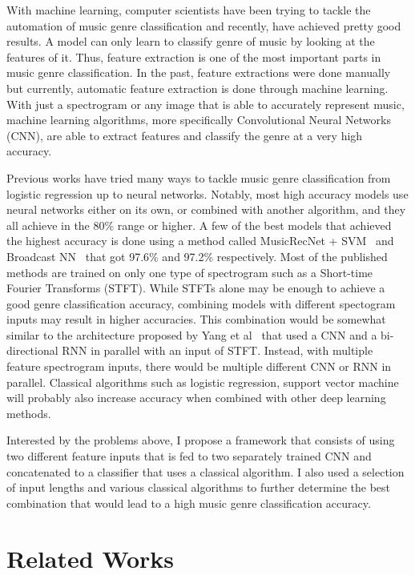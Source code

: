 \documentclass[10pt,twocolumn,letterpaper]{article}
\begin{document}
	With machine learning, computer scientists have been trying to tackle the automation of music genre classification and recently, have achieved pretty good results. A model can only learn to classify genre of music by looking at the features of it. Thus, feature extraction is one of the most important parts in music genre classification. In the past, feature extractions were done manually but currently, automatic feature extraction is done through machine learning. With just a spectrogram or any image that is able to accurately represent music, machine learning algorithms, more specifically Convolutional Neural Networks (CNN), are able to extract features and classify the genre at a very high accuracy.
	
	Previous works have tried many ways to tackle music genre classification from logistic regression up to neural networks. Notably, most high accuracy models use neural networks either on its own, or combined with another algorithm, and they all achieve in the 80\% range or higher. A few of the best models that achieved the highest accuracy is done using a method called MusicRecNet + SVM~\cite{elbir2020music} and Broadcast NN~\cite{liu2020bottom} that got 97.6\% and 97.2\% respectively. Most of the published methods are trained on only one type of spectrogram such as a Short-time Fourier Transforms (STFT). While STFTs alone may be enough to achieve a good genre classification accuracy, combining models with different spectogram inputs may result in higher accuracies. This combination would be somewhat similar to the architecture proposed by Yang et al~\cite{yang2020parallel} that used a CNN and a bi-directional RNN in parallel with an input of STFT. Instead, with multiple feature spectrogram inputs, there would be multiple different CNN or RNN in parallel. Classical algorithms such as logistic regression, support vector machine will probably also increase accuracy when combined with other deep learning methods. 
	
	Interested by the problems above, I propose a framework that consists of using two different feature inputs that is fed to two separately trained CNN and concatenated to a classifier that uses a classical algorithm. I also used a selection of input lengths and various classical algorithms to further determine the best combination that would lead to a high music genre classification accuracy.
	
	\section{Related Works} %
	
\end{document}
